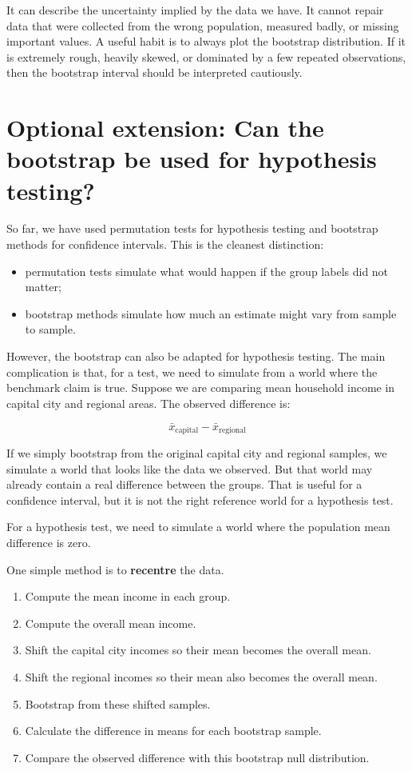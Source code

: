 \documentclass[
  letterpaper,
  DIV=11,
  numbers=noendperiod]{scrreprt}
\providecommand{\tightlist}{%
  \setlength{\itemsep}{0pt}\setlength{\parskip}{0pt}}
\begin{document}
It can describe the uncertainty implied by the data we have. It cannot
repair data that were collected from the wrong population, measured
badly, or missing important values. A useful habit is to always plot the
bootstrap distribution. If it is extremely rough, heavily skewed, or
dominated by a few repeated observations, then the bootstrap interval
should be interpreted cautiously.

\section{Optional extension: Can the bootstrap be used for hypothesis
testing?}\label{optional-extension-can-the-bootstrap-be-used-for-hypothesis-testing}

So far, we have used permutation tests for hypothesis testing and
bootstrap methods for confidence intervals. This is the cleanest
distinction:

\begin{itemize}
\tightlist
\item
  permutation tests simulate what would happen if the group labels did
  not matter;
\item
  bootstrap methods simulate how much an estimate might vary from sample
  to sample.
\end{itemize}

However, the bootstrap can also be adapted for hypothesis testing. The
main complication is that, for a test, we need to simulate from a world
where the benchmark claim is true. Suppose we are comparing mean
household income in capital city and regional areas. The observed
difference is:

\[\bar{x}_{\text{capital}} - \bar{x}_{\text{regional}}\]

If we simply bootstrap from the original capital city and regional
samples, we simulate a world that looks like the data we observed. But
that world may already contain a real difference between the groups.
That is useful for a confidence interval, but it is not the right
reference world for a hypothesis test.

For a hypothesis test, we need to simulate a world where the population
mean difference is zero.

One simple method is to \textbf{recentre} the data.

\begin{enumerate}
\def\labelenumi{\arabic{enumi}.}
\tightlist
\item
  Compute the mean income in each group.
\item
  Compute the overall mean income.
\item
  Shift the capital city incomes so their mean becomes the overall mean.
\item
  Shift the regional incomes so their mean also becomes the overall
  mean.
\item
  Bootstrap from these shifted samples.
\item
  Calculate the difference in means for each bootstrap sample.
\item
  Compare the observed difference with this bootstrap null distribution.
\end{enumerate}
\end{document}
